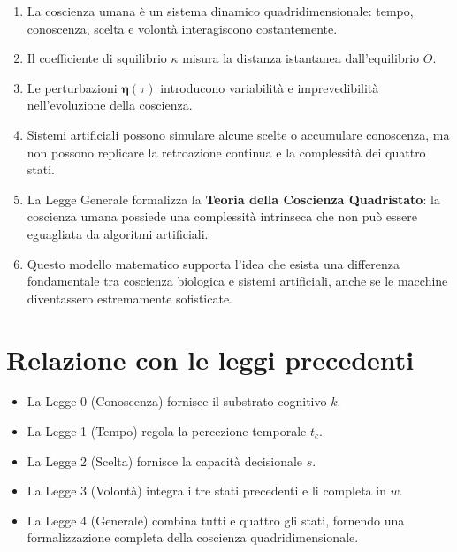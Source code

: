 \documentclass[12pt,a4paper]{article}
\begin{document}
\begin{enumerate}
    \item La coscienza umana è un sistema dinamico quadridimensionale: tempo, conoscenza, scelta e volontà interagiscono costantemente.
    \item Il coefficiente di squilibrio $\kappa$ misura la distanza istantanea dall’equilibrio $O$.
    \item Le perturbazioni $\mathbf{\eta}(\tau)$ introducono variabilità e imprevedibilità nell’evoluzione della coscienza.
    \item Sistemi artificiali possono simulare alcune scelte o accumulare conoscenza, ma non possono replicare la retroazione continua e la complessità dei quattro stati.
    \item La Legge Generale formalizza la \textbf{Teoria della Coscienza Quadristato}: la coscienza umana possiede una complessità intrinseca che non può essere eguagliata da algoritmi artificiali.
    \item Questo modello matematico supporta l’idea che esista una differenza fondamentale tra coscienza biologica e sistemi artificiali, anche se le macchine diventassero estremamente sofisticate.
\end{enumerate}

\section{Relazione con le leggi precedenti}

\begin{itemize}
    \item La Legge 0 (Conoscenza) fornisce il substrato cognitivo $k$.
    \item La Legge 1 (Tempo) regola la percezione temporale $t_c$.
    \item La Legge 2 (Scelta) fornisce la capacità decisionale $s$.
    \item La Legge 3 (Volontà) integra i tre stati precedenti e li completa in $w$.
    \item La Legge 4 (Generale) combina tutti e quattro gli stati, fornendo una formalizzazione completa della coscienza quadridimensionale.
\end{itemize}
\end{document}
